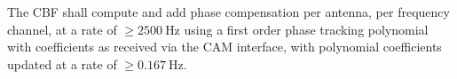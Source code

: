 The CBF shall compute and add phase compensation per antenna, per frequency
channel, at a rate of $\ge \SI{2500}{\hertz}$ using a first order phase
tracking polynomial with coefficients as received via the CAM interface, with
polynomial coefficients updated at a rate of $\ge \SI{0.167}{\hertz}.$
